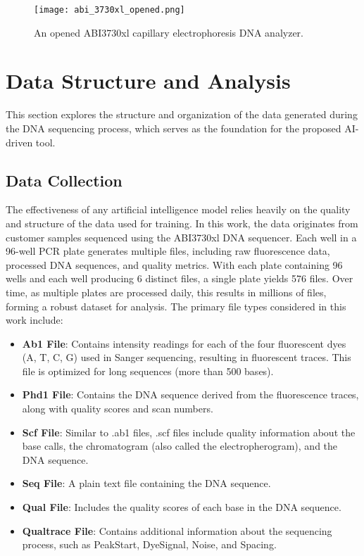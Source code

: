 \begin{figure}[h]
\centering
\texttt{[image: abi\_3730xl\_opened.png]}
\caption{An opened ABI3730xl capillary electrophoresis DNA analyzer.}
\label{fig:abi_3730xl_opened}
\end{figure}

\section{Data Structure and Analysis}
\label{sec:data_analysis}

This section explores the structure and organization of the data generated during the DNA sequencing process, which serves as the foundation for the proposed AI-driven tool.

\subsection{Data Collection}

The effectiveness of any artificial intelligence model relies heavily on the quality and structure of the data used for training. In this work, the data originates from customer samples sequenced using the ABI3730xl DNA sequencer. Each well in a 96-well PCR plate generates multiple files, including raw fluorescence data, processed DNA sequences, and quality metrics. With each plate containing 96 wells and each well producing 6 distinct files, a single plate yields 576 files. Over time, as multiple plates are processed daily, this results in millions of files, forming a robust dataset for analysis.
The primary file types considered in this work include:

\begin{itemize}
  \item \textbf{Ab1 File}: Contains intensity readings for each of the four fluorescent dyes (A, T, C, G) used in Sanger sequencing, resulting in fluorescent traces. This file is optimized for long sequences (more than 500 bases).
  \item \textbf{Phd1 File}: Contains the DNA sequence derived from the fluorescence traces, along with quality scores and scan numbers.
  \item \textbf{Scf File}: Similar to .ab1 files, .scf files include quality information about the base calls, the chromatogram (also called the electropherogram), and the DNA sequence.
  \item \textbf{Seq File}: A plain text file containing the DNA sequence.
  \item \textbf{Qual File}: Includes the quality scores of each base in the DNA sequence.
  \item \textbf{Qualtrace File}: Contains additional information about the sequencing process, such as PeakStart, DyeSignal, Noise, and Spacing.
\end{itemize}

